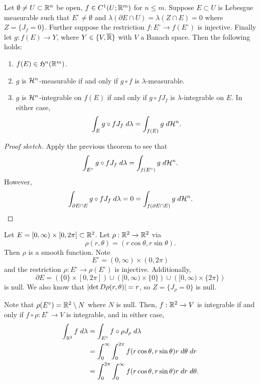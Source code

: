 \documentclass[a4paper]{article}
\begin{document}
\begin{thm}
Let $\emptyset \neq U \subset \mathbb{R}^n$ be open, $f \in C^1 
(U ; \mathbb{R}^m)$ for $n \leq m$. Suppose $E \subset U$ is Lebesgue
measurable such that $E^\circ \neq \emptyset$ and 
$\lambda (\partial E \cap U) = \lambda (Z \cap E) = 0$
where $Z = \{J_f = 0\}$. Further suppose 
the restriction $f : E^\circ \to f(E^\circ)$ is injective.
Finally let $g : f(E) \to Y$, where $Y \in \{V, \overline{\mathbb{R}}\}$ 
with $V$ a Banach space. Then the following holds: 
\begin{enumerate}
\item $f(E) \in \mathfrak{H}^n (\mathbb{R}^m)$.
\item $g$ is $\mathcal{H}^n$-measurable if and only if 
$g \circ f$ is $\lambda$-measurable.
\item $g$ is $\mathcal{H}^n$-integrable on $f(E)$
if and only if $g \circ f J_f$ is $\lambda$-integrable
on $E$. In either case, 
\[
\int_E g \circ f J_f  \; d \lambda 
= \int_{f(E)} g \; d \mathcal{H}^n.
\]
\end{enumerate}
\end{thm}

\begin{proof}[Proof sketch]
Apply the previous theorem to see that 
\[
\int_{E^\circ} g \circ f J_f \; d \lambda
= \int_{f(E^\circ)} g \; d \mathcal{H}^n.
\]
However, 
\[
\int_{\partial E \cap E} g \circ f J_f \; d \lambda
= 0 = \int_{f(\partial E \cap E)} g \; d \mathcal{H}^n.
\]
\end{proof}

\begin{eg}
Let $E = [0, \infty) \times [0, 2 \pi] \subset \mathbb{R}^2$. 
Let $\rho: \mathbb{R}^2 \to \mathbb{R}^2$ via 
\[
\rho(r, \theta) = (r \cos \theta, r \sin \theta).
\]
Then $\rho$ is a smooth function. Note 
\[
E^\circ = (0, \infty) \times (0, 2\pi)
\]
and the restriction $\rho : E^\circ \to \rho(E^\circ)$ is
injective. Additionally, 
\[
\partial E = \left( \{0\} \times [0, 2 \pi] \right) \cup 
\left( [0, \infty) \times \{0\} \right) \cup 
\left( [0, \infty) \times \{2 \pi\} \right)
\]
is null. We also know that $\left\lvert \det D\rho (r, \theta)\right\rvert = r$, 
so $Z = \{J_\rho = 0\}$ is null. 

Note that $\rho(E^\circ) = \mathbb{R}^2 \setminus N$
where $N$ is null. Then, $f : \mathbb{R}^2 \to V$ is integrable
if and only if $f \circ \rho : E^\circ \to V$ is integrable,
and in either case, 
\[
\begin{aligned}
\int_{\mathbb{R}^2} f \; d \lambda 
&= \int_{E^\circ} f \circ \rho J_{\rho}  \; d \lambda \\
&= \int_0^\infty \int_0^{2\pi} f(r \cos \theta, r \sin \theta)
r \; d \theta \; d r \\
&= \int_0^{2\pi} \int_0^\infty f(r \cos \theta, r \sin \theta) 
r \; d r \; d \theta.
\end{aligned}
\]
\end{eg}
\end{document}
